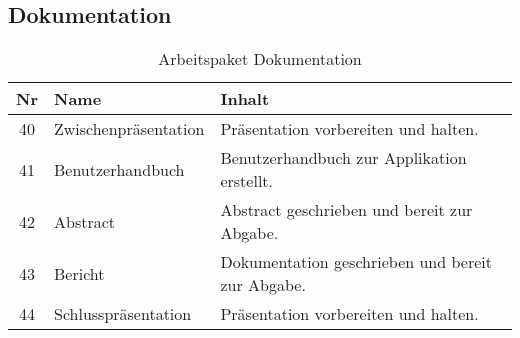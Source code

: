 \subsection{Dokumentation}
\begin{table}[H]
\begin{tabularx}{\textwidth}{ c | l | X }
\textbf{Nr} & \textbf{Name} & \textbf{Inhalt} \\ \hline
40 & Zwischenpräsentation & Präsentation vorbereiten und halten.\\ \hline
41 & Benutzerhandbuch & Benutzerhandbuch zur Applikation erstellt.\\ \hline
42 & Abstract & Abstract geschrieben und bereit zur Abgabe.\\ \hline
43 & Bericht & Dokumentation geschrieben und bereit zur Abgabe.\\ \hline
44 & Schlusspräsentation & Präsentation vorbereiten und halten.\\ \hline
\end{tabularx}
\caption{Arbeitspaket Dokumentation}
\end{table}
